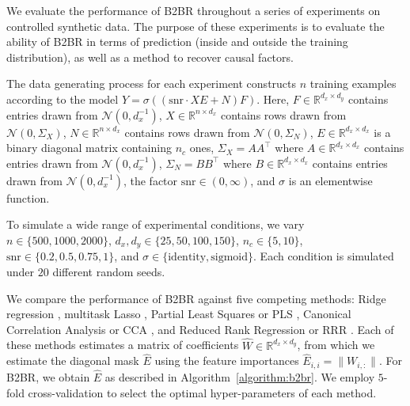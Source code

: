 We evaluate the performance of B2BR throughout a series of experiments on controlled synthetic data.
%
The purpose of these experiments is to evaluate the ability of B2BR in terms of prediction (inside and outside the training distribution), as well as a method to recover causal factors.

The data generating process for each experiment constructs $n$ training examples according to the model $Y = \sigma((\text{snr} \cdot XE + N)F)$.
%
Here, 
    $F \in \mathbb{R}^{d_x \times d_y}$ contains entries drawn from $\mathcal{N}(0, d_x^{-1})$,
    $X \in \mathbb{R}^{n \times d_x}$ contains rows drawn from $\mathcal{N}(0, \Sigma_X)$,
    $N \in \mathbb{R}^{n \times d_x}$ contains rows drawn from $\mathcal{N}(0, \Sigma_N)$,
    $E \in \mathbb{R}^{d_x \times d_x}$ is a binary diagonal matrix containing $n_c$ ones,
    $\Sigma_X = AA^\top$ where $A \in \mathbb{R}^{d_x \times d_x}$ contains entries drawn from $\mathcal{N}(0, d_x^{-1})$,
    $\Sigma_N = BB^\top$ where $B \in \mathbb{R}^{d_x \times d_x}$ contains entries drawn from $\mathcal{N}(0, d_x^{-1})$,
the factor $\text{snr} \in (0, \infty)$, and $\sigma$ is an elementwise function.

To simulate a wide range of experimental conditions, we vary $n \in \{500, 1000, 2000\}$, $d_x, d_y \in \{ 25, 50, 100, 150 \}$, $n_c \in \{ 5, 10 \}$, $\text{snr} \in \{ 0.2, 0.5, 0.75, 1 \}$, and $\sigma \in \{ \text{identity}, \text{sigmoid} \}$.
%
Each condition is simulated under $20$ different random seeds. 

We compare the performance of B2BR against five competing methods:
%
Ridge regression \citep{hoerl1959optimum}, multitask Lasso \citep{argyriou2008convex}, Partial Least Squares or PLS \citep{wold_pls, tenenhaus_pls}, Canonical Correlation Analysis or CCA \citep{cca_hotelling}, and Reduced Rank Regression or RRR \citep{Izenman_rrr}.
%
Each of these methods estimates a matrix of coefficients $\hat{W} \in \mathbb{R}^{d_x \times d_y}$, from which we estimate the diagonal mask $\hat{E}$ using the feature importances $\hat{E}_{i,i} = \| W_{i, :} \|$.
%
For B2BR, we obtain $\hat{E}$ as described in Algorithm~\ref{algorithm:b2br}.
%
We employ $5$-fold cross-validation to select the optimal hyper-parameters of each method. 

